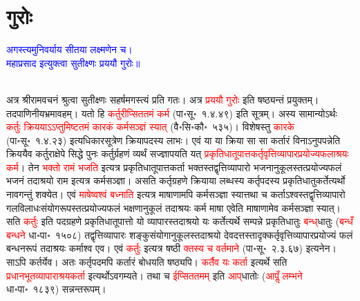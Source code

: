 \section[गुरोः]{गुरोः}
\centering\textcolor{blue}{अगस्त्यमुनिवर्याय सीतया लक्ष्मणेन च।\nopagebreak\\
महाप्रसाद इत्युक्त्वा सुतीक्ष्णः प्रययौ गुरोः॥}\nopagebreak\\
\\
\begin{sloppypar}\justifying\noindent\hspace{10mm} अत्र श्रीराम\-वचनं श्रुत्वा सुतीक्ष्णः सहर्षमगस्त्यं प्रति गतः। अत्र \textcolor{red}{प्रययौ गुरोः} इति षष्ठ्यन्तं प्रयुक्तम्। तदपाणिनीय\-भ्रमावहम्। यतो हि \textcolor{red}{कर्तुरीप्सिततमं कर्म} (पा॰सू॰~१.४.४९) इति सूत्रम्। अस्य सामान्योऽर्थः \textcolor{red}{कर्तुः क्रिययाऽऽप्तुमिष्टतमं कारकं कर्म\-सञ्ज्ञं स्यात्‌} (वै॰सि॰कौ॰~५३५)। विशेषस्तु \textcolor{red}{कारके} (पा॰सू॰~१.४.२३) इत्यधिकार\-सूत्रेण क्रिया\-पदस्य लाभः। एवं या या क्रिया सा सा कर्तारं विनाऽनुपपन्नेति क्रिययैव कर्तुराक्षेपे सिद्धे पुनः कर्तुर्ग्रहणं व्यर्थं सज्ज्ञापयति यत् 
\textcolor{red}{प्रकृति\-धातूपात्त\-कर्तृ\-वृत्ति\-व्यापार\-प्रयोज्य\-फलाश्रयः कर्म}। तेन \textcolor{red}{भक्तो रामं भजति} इत्यत्र
प्रकृति\-धातूपात्त\-कर्ता भक्तस्तद्वृत्ति\-व्यापारो भजनानुकूलस्तत्प्रयोज्य\-फलं भजनं तदाश्रयो राम इत्यत्र कर्म\-सञ्ज्ञा। असति कर्तृ\-ग्रहणे क्रियाया लब्धस्य कर्तृ\-पदस्य प्रकृति\-धातु\-कर्तेत्यर्थो नावगन्तुं शक्येत। एवं \textcolor{red}{माषेष्वश्वं बध्नाति} इत्यत्र माषाणामपि कर्म\-सञ्ज्ञा स्यात्तथा च कर्ताऽश्वस्तद्वृत्ति\-व्यापारो गल\-विलाधः\-संयोगरूपस्तत्प्रयोज्य\-फलं भक्षणानुकूलं तदाश्रयः कर्म माषा एवेति माषाणामेव कर्म\-सञ्ज्ञा स्यात्। सति \textcolor{red}{कर्तुः} इति पद\-ग्रहणे प्रकृति\-धातूपात्तो यो व्यापारस्तदाश्रयो यः कर्तेत्यर्थे सम्पन्ने प्रकृति\-धातुः \textcolor{red}{बन्ध्‌}\-धातुः (\textcolor{red}{बन्धँ बन्धने} धा॰पा॰~१५०८) तद्वृत्ति\-व्यापारः शङ्कु\-संयोगानुकूलस्तदाश्रयो देवदत्तस्तादृक्कर्तृ\-वृत्ति\-व्यापार\-प्रयोज्यं फलं बन्धन\-रूपं तदाश्रयः कर्माश्व एव। एवं \textcolor{red}{कर्तुः} इत्यत्र षष्ठी \textcolor{red}{क्तस्य च वर्तमाने} (पा॰सू॰~२.३.६७) इत्यनेन। साऽपि कर्तर्येव। अतः कर्तृ\-पदमपि कर्तारं बोधयति षष्ठ्यपि। \textcolor{red}{कर्तैव यः कर्ता} इत्यर्थे सति \textcolor{red}{प्रधान\-भूत\-व्यापाराश्रय\-कर्ता} इत्यर्थोऽवगम्यते। तथा च \textcolor{red}{ईप्सिततमम्‌} इति \textcolor{red}{आप्‌}\-धातोः (\textcolor{red}{आपॢँ लम्भने} धा॰पा॰~१८३९) सन्नन्त\-रूपम्।

\end{sloppypar}
